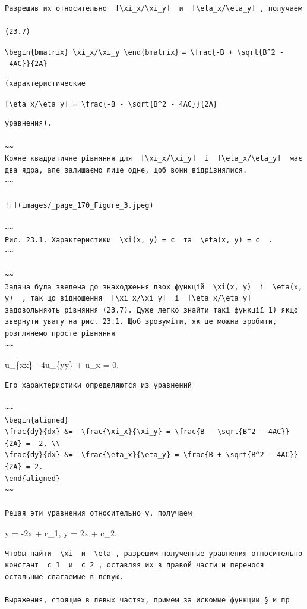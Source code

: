 \documentclass[
  ukrainian,
]{article}
\begin{document}
\begin{verbatim}
Разрешив их относительно  [\xi_x/\xi_y]  и  [\eta_x/\eta_y] , получаем

(23.7)
\end{verbatim}

\texttt{\textbackslash{}begin\{bmatrix\}\ \textbackslash{}xi\_x/\textbackslash{}xi\_y\ \textbackslash{}end\{bmatrix\}}
\texttt{=\ \textbackslash{}frac\{-B\ +\ \textbackslash{}sqrt\{B\^{}2\ -\ 4AC\}\}\{2A\}}

\begin{verbatim}
(характеристические
\end{verbatim}

\texttt{{[}\textbackslash{}eta\_x/\textbackslash{}eta\_y{]}\ =\ \textbackslash{}frac\{-B\ -\ \textbackslash{}sqrt\{B\^{}2\ -\ 4AC\}\}\{2A\}}

\begin{verbatim}
уравнения).

~~
Кожне квадратичне рівняння для  [\xi_x/\xi_y]  і  [\eta_x/\eta_y]  має два ядра, але залишаємо лише одне, щоб вони відрізнялися.
~~

![](images/_page_170_Figure_3.jpeg)

~~
Рис. 23.1. Характеристики  \xi(x, y) = c  та  \eta(x, y) = c  .
~~

~~
Задача була зведена до знаходження двох функцій  \xi(x, y)  і  \eta(x, y)  , так що відношення  [\xi_x/\xi_y]  і  [\eta_x/\eta_y]  задовольняють рівняння (23.7). Дуже легко знайти такі функції 1) якщо звернути увагу на рис. 23.1. Щоб зрозуміти, як це можна зробити, розглянемо просте рівняння
~~
\end{verbatim}

u\_\{xx\} - 4u\_\{yy\} + u\_x = 0.

\begin{verbatim}
Его характеристики определяются из уравнений

~~
\begin{aligned}
\frac{dy}{dx} &= -\frac{\xi_x}{\xi_y} = \frac{B - \sqrt{B^2 - 4AC}}{2A} = -2, \\
\frac{dy}{dx} &= -\frac{\eta_x}{\eta_y} = \frac{B + \sqrt{B^2 - 4AC}}{2A} = 2.
\end{aligned}
~~

Решая эти уравнения относительно у, получаем
\end{verbatim}

y = -2x + c\_1, y = 2x + c\_2.

\begin{verbatim}
Чтобы найти  \xi  и  \eta , разрешим полученные уравнения относительно констант  c_1  и  c_2 , оставляя их в правой части и перенося остальные слагаемые в левую.

Выражения, стоящие в левых частях, примем за искомые функции § и пр
\end{verbatim}
\end{document}
